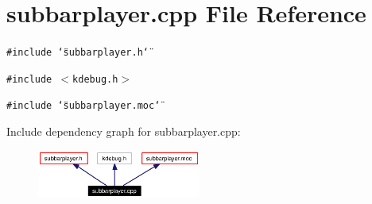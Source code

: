 \section{subbarplayer.cpp File Reference}
\label{subbarplayer_8cpp}


{\tt \#include \char`\"{}subbarplayer.h\char`\"{}}\par
{\tt \#include $<$kdebug.h$>$}\par
{\tt \#include \char`\"{}subbarplayer.moc\char`\"{}}\par


Include dependency graph for subbarplayer.cpp:\begin{figure}[H]
\begin{center}
\leavevmode
\includegraphics[width=152pt]{subbarplayer_8cpp__incl}
\end{center}
\end{figure}
